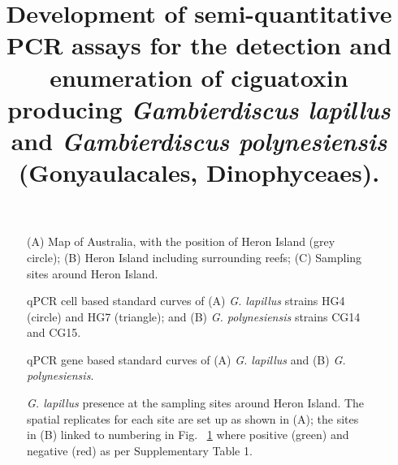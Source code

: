 \documentclass[12pt]{article}
\title{Development of semi-quantitative PCR assays for the detection and enumeration of ciguatoxin producing \emph{Gambierdiscus lapillus} and \emph{Gambierdiscus polynesiensis} (Gonyaulacales, Dinophyceaes).}
\author{}
\date{}
\begin{document}
\maketitle


\begin{figure} 
\caption{(A) Map of Australia, with the position of Heron Island (grey circle); (B) Heron Island including surrounding reefs; (C) Sampling sites around Heron Island.} 
\label{fig:samplesites}
\end{figure} 
\FloatBarrier

\begin{figure}
\caption{qPCR cell based standard curves of (A) \emph{G. lapillus} strains HG4 (circle) and HG7 (triangle); and (B) \emph{G. polynesiensis} strains CG14 and CG15.} %
\label{fig:stdCurve}
\end{figure}
\FloatBarrier

\begin{figure}
\caption{qPCR gene based standard curves of (A) \emph{G. lapillus} and (B) \emph{G. polynesiensis}.} %
\label{fig:lapigblocks}
\end{figure}
\FloatBarrier

\FloatBarrier 
\begin{figure} 
\caption{\emph{G. lapillus} presence at the sampling sites around Heron Island. The spatial replicates for each site are set up as shown in (A); the sites in (B) linked to numbering in Fig. ~\ref{fig:samplesites} where positive (green) and negative (red) as per Supplementary Table 1.} 
\label{fig:envposneg}
\end{figure} 
\FloatBarrier
\end{document}
